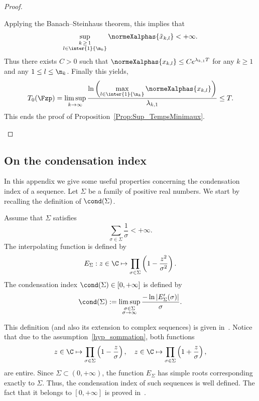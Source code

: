 \begin{proof}
\begin{itemize}
Applying the Banach--Steinhaus theorem, this implies that
\[
\sup_{\substack{k\,\geq\,1 \\ l\in \inter{1}{\n_k}}} \normeXalphas{ \tilde{x}_{k,l} } < + \infty.
\]
Thus there exists $C>0$ such that $\normeXalphas{x_{k,l}} \leq C e^{\lambda_{k,1} T}$ for any $k \geq 1$ and any $1\leq l\leq \n_k$. Finally this yields,
\[
T_{0}(\Fzp) = \limsup_{k \to \infty} \frac{\ln \left(\max\limits_{l\in \inter{1}{\n_k}} \normeXalphas{ x_{k,l} } \right)}{\lambda_{k,1}} \leq T.
\]
This ends the proof of Proposition~\ref{Prop:Sup_TempsMinimaux}.
\end{itemize}
\end{proof}



\subsection{On the condensation index} \label{AnnexeCondensation}


In this appendix we give some useful properties concerning the condensation index of a sequence. Let $\Sigma$ be a family of positive real numbers. We start by recalling the definition of $\cond(\Sigma)$.
\begin{defi} \label{Def:Condensation_Shackell}
Assume that $\Sigma$ satisfies
\begin{equation}\label{hyp_sommation}
\sum\limits_{\sigma\in \Sigma} \frac{1}{\sigma} <+\infty.
\end{equation}
The interpolating function is defined by
\begin{equation}\label{DefE}
E_\Sigma : z \in \C \mapsto \prod_{\sigma\in \Sigma}\left(1 - \frac{z^2}{\sigma^2} \right).
\end{equation}
The condensation index $\cond(\Sigma)\in [0,+\infty]$ is defined by
\[
\cond(\Sigma) := \limsup_{\substack{\sigma\in\Sigma\\ \sigma \to \infty}} \frac{- \ln |E_\Sigma'(\sigma)|}{\sigma}.
\]
\end{defi}
This definition (and also its extension to complex sequences) is given in~\cite{Shackell69}. Notice that due to the assumption~\eqref{hyp_sommation}, both functions
\[
z \in \C \mapsto \prod_{\sigma\in \Sigma}\left(1 - \frac{z}{\sigma} \right),
\quad z \in \C \mapsto \prod_{\sigma\in \Sigma}\left(1 + \frac{z}{\sigma} \right),
\]
are entire. Since $\Sigma \subset (0, +\infty)$, the function $E_\Sigma$ has simple roots corresponding exactly to $\Sigma$. Thus, the condensation index of such sequences is well defined. The fact that it belongs to $[0,+\infty]$ is proved in~\cite{AmmarKhodjaBenabdallahGonzalez-BurgosdeTeresa:2014}.



